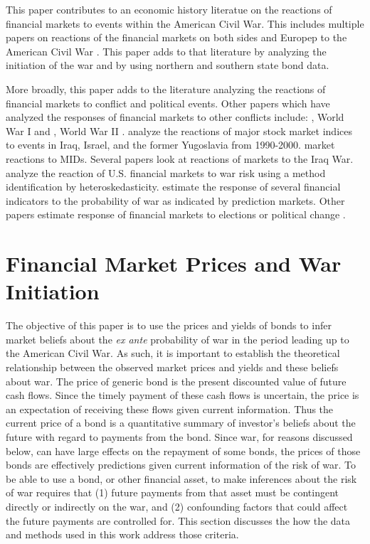 \documentclass[11pt, oneside, article]{memoir}\usepackage[]{graphicx}\usepackage[]{color}
\begin{document}
This paper contributes to an economic history literatue on the reactions of financial markets to events within the American Civil War.
This includes multiple papers on reactions of the financial markets on both sides and Europep to the American Civil War \textcites{Schwab1901}{Mitchell1903}{WillardGuinnaneEtAl1996}{McCandless1996}{SmithSmith1997}{BrownBurdekin2000}{Weidenmier2002}.
This paper adds to that literature by analyzing the initiation of the war and by using northern and southern state bond data.

More broadly, this paper adds to the literature analyzing the reactions of financial markets to conflict and political events.
Other papers which have analyzed the responses of financial markets to other conflicts include:  \textcite{Bueno1990}, World War I \textcite{Hall2004} and \textcite{Ferguson2006}, World War II \textcites{WaldenstromFrey2008}{WaldenstromFrey2008}.
\textcite{SchneiderTroeger2006} analyze the reactions of major stock market indices to events in Iraq, Israel, and the former Yugoslavia from 1990-2000.
\textcite{GuidolinLaFerrara2010} market reactions to MIDs.
Several papers look at reactions of markets to the Iraq War.
\textcite{RigobonSack2005} analyze the reaction of U.S. financial markets to war risk using a method identification by heteroskedasticity.
\textcites{LeighWolfersEtAl2003}{WolfersZitzewitz2009} estimate the response of several financial indicators to the probability of war as indicated by prediction markets.
Other papers estimate response of financial markets to elections or political change \parencites{Jayachandr2006}{Herron2000}.



\section{Financial Market Prices and War Initiation}
\label{sec:risky-bond-pricing}

The objective of this paper is to use the prices and yields of bonds to infer market beliefs about the \textit{ex ante} probability of war in the period leading up to the American Civil War.
As such, it is important to establish the theoretical relationship between the observed market prices and yields and these beliefs about war.
The price of generic bond is the present discounted value of future cash flows.
Since the timely payment of these cash flows is uncertain, the price is an expectation of receiving these flows given current information.
Thus the current price of a bond is a quantitative summary of investor's beliefs about the future with regard to payments from the bond.
Since war, for reasons discussed below, can have large effects on the repayment of some bonds, the prices of those bonds are effectively predictions given current information of the risk of war.
To be able to use a bond, or other financial asset, to make inferences about the risk of war requires that (1) future payments from that asset must be contingent directly or indirectly on the war, and (2) confounding factors that could affect the future payments are controlled for.
This section discusses the how the data and methods used in this work address those criteria.
\end{document}
